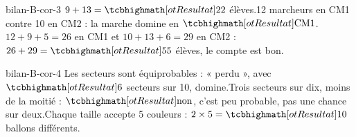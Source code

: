 \begin{blocEdition}{bilan-B-cor-3}
$9+13=\res{22}$ élèves.12 marcheurs en CM1 contre 10 en CM2 : la marche domine en $\res{\text{CM1}}$.$12+9+5=26$ en CM1 et $10+13+6=29$ en CM2 : $26+29=\res{55}$ élèves, le compte est bon.
\end{blocEdition}
\begin{blocEdition}{bilan-B-cor-4}
Les secteurs sont équiprobables : « perdu », avec $\res6$ secteurs sur 10, domine.Trois secteurs sur dix, moins de la moitié : $\res{\text{non}}$, c’est peu probable, pas une chance sur deux.Chaque taille accepte 5 couleurs : $2\times5=\res{10}$ ballons différents.
\end{blocEdition}
